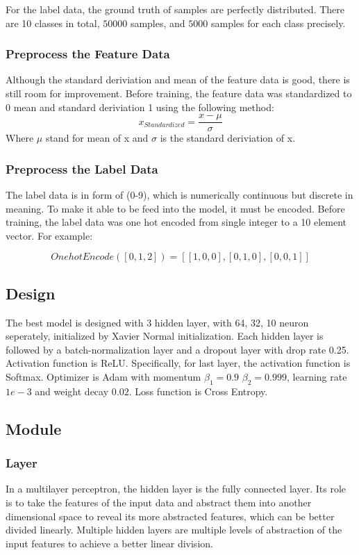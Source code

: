\documentclass{article}[12pt]
\begin{document}
    For the label data, the ground truth of samples are perfectly distributed.
    There are 10 classes in total, $50000$ samples, and $5000$ samples for each class precisely.

\subsubsection{Preprocess the Feature Data}
    Although the standard deriviation and mean of the feature data is good, there is still room for improvement.
    Before training, the feature data was standardized to 0 mean and standard deriviation 1 using the following method:
\[ x_{Standardized} = \frac{x - \mu}{\sigma} \]
    Where $\mu$ stand for mean of x and $\sigma$ is the standard deriviation of x.

\subsubsection{Preprocess the Label Data}
    The label data is in form of (0-9), which is numerically continuous but discrete in meaning.
    To make it able to be feed into the model, it must be encoded.
    Before training, the label data was one hot encoded from single integer to a 10 element vector.
    For example:

    \[ OnehotEncode([0, 1, 2]) = [[1, 0, 0], [0,1,0],[0,0,1]] \]

\subsection{Design}
    The best model is designed with 3 hidden layer, with 64, 32, 10 neuron seperately, initialized by
    Xavier Normal initialization.
    Each hidden layer is followed by a batch-normalization layer and a dropout layer with drop rate 0.25.
    Activation function is ReLU. Specifically, for last layer, the activation function is Softmax.
    Optimizer is Adam with momentum $\beta_1 = 0.9$ $\beta_2 = 0.999$,
    learning rate $1e-3$ and weight decay $0.02$.
    Loss function is Cross Entropy.

\subsection{Module}
\subsubsection{Layer}
    In a multilayer perceptron, the hidden layer is the fully connected layer.
    Its role is to take the features of the input data and abstract them into another dimensional space
    to reveal its more abstracted features, which can be better divided linearly.
    Multiple hidden layers are multiple levels of abstraction of the input features to achieve a better linear division.
\end{document}
